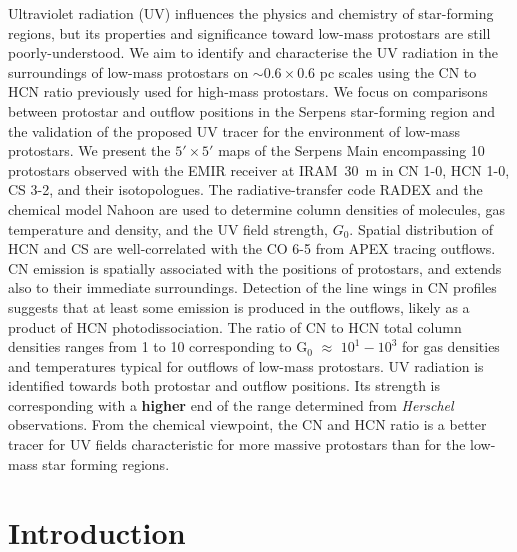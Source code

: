 \documentclass{aa}
\begin{document}
% 
\abstract
{Ultraviolet radiation (UV) influences the physics and chemistry of star-forming regions,
but its properties and significance toward low-mass protostars are still poorly-understood.} 
{We aim to identify and characterise the UV radiation in the surroundings of low-mass
protostars on $\sim 0.6\times0.6$ pc scales
using the CN to HCN ratio previously used for high-mass protostars.
We focus on comparisons between protostar and outflow positions in the Serpens star-forming 
region and the validation of the proposed UV tracer for the environment of low-mass protostars.}
{We present the $5'\times5'$ maps of the Serpens Main encompassing 10 protostars observed with the EMIR receiver at IRAM~30~m 
in CN 1-0, HCN 1-0, CS 3-2, and their isotopologues. The radiative-transfer code RADEX and 
the chemical model Nahoon are used to determine column densities of molecules, gas temperature and density,
and the UV field strength, $G_\mathrm{0}$.}
{Spatial distribution of HCN and CS are well-correlated with the CO 6-5 from APEX tracing 
outflows. CN emission is spatially associated with the positions of protostars, and extends also
to their immediate surroundings. Detection of the line wings in CN profiles 
suggests that at least some emission is produced in the outflows, likely as a product 
of HCN photodissociation. The ratio of CN to HCN total column densities ranges from 
1 to 10 corresponding to G$_0$ $\approx$ $10^{1}-10^{3}$ for gas densities and 
temperatures typical for outflows of low-mass protostars.}
{UV radiation is identified towards both protostar and outflow positions. Its strength is corresponding with a \textbf{higher} end of the range determined from \textit{Herschel} observations. From the chemical viewpoint, the CN and HCN ratio is a better tracer for UV fields characteristic for more massive protostars than for the low-mass star forming regions.}

\maketitle
%
%
\section{Introduction} 
\label{section:intro}
\end{document}
